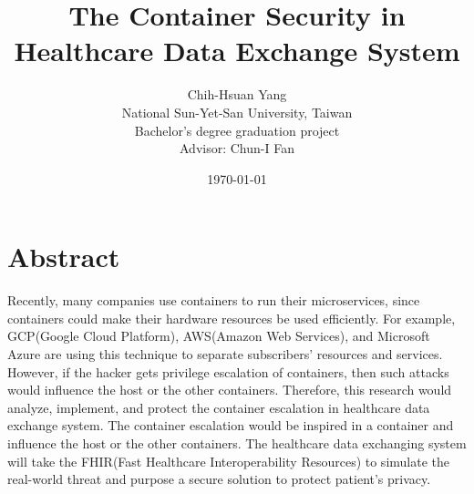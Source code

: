 \documentclass[12pt,a4paper]{article}
\title{{The Container Security in Healthcare Data Exchange System}}
\author{Chih-Hsuan Yang\\
National Sun-Yet-San University, Taiwan \\
Bachelor's degree graduation project \\
Advisor: Chun-I Fan
}
\date{\today}
\begin{document}
\section{Abstract}
Recently, many companies use containers to run their microservices, since containers could
make their hardware resources be used efficiently. For example, GCP(Google Cloud Platform),
AWS(Amazon Web Services), and Microsoft Azure are using this technique to separate subscribers'
resources and services. However, if the hacker gets privilege escalation of containers, then
such attacks would influence the host or the other containers.
Therefore, this research would analyze, implement, and protect the container escalation in
healthcare data exchange system.
The container escalation would be inspired in a container and influence the host or the
other containers. The healthcare data exchanging system will take the FHIR(Fast
Healthcare Interoperability Resources) \cite{FHIR_home} to simulate the real-world threat and
purpose a secure solution to protect patient's privacy.

\end{document}
